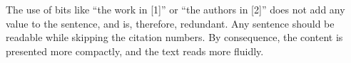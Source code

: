 


\noindent
The use of bits like ``the work in [1]'' or ``the authors in [2]'' does not add any value to the sentence, and is, therefore, redundant.
Any sentence should be readable while skipping the citation numbers.
By consequence, the content is presented more compactly, and the text reads more fluidly.
